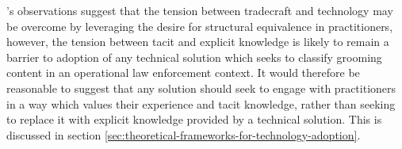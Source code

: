 \documentclass[12pt,a4paper,oneside]{report}
\begin{document}
\citet{shih2026two}'s observations suggest that the tension between tradecraft and technology may be overcome by leveraging the desire for structural equivalence in practitioners, however, the tension between tacit and explicit knowledge is likely to remain a barrier to adoption of any technical solution which seeks to classify grooming content in an operational law enforcement context.  It would therefore be reasonable to suggest that any solution should seek to engage with practitioners in a way which values their experience and tacit knowledge, rather than seeking to replace it with explicit knowledge provided by a technical solution.  This is discussed in section \ref{sec:theoretical-frameworks-for-technology-adoption}.

\newpage

\begingroup
\footnotesize
\setlength{\LTpre}{6pt}
\setlength{\LTpost}{6pt}
\setlength{\tabcolsep}{4pt}
\hfuzz=3pt
\end{document}

